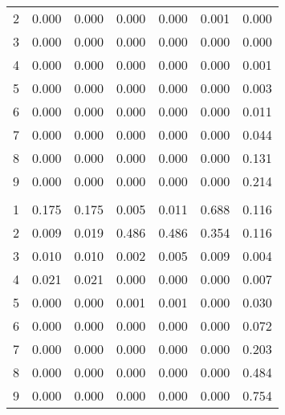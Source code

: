 \documentclass[12pt]{article}
\theoremstyle{plain}
\numberwithin{equation}{section}
\begin{document}
\begin{footnotesize}
\begin{longtable}[t]{ccccccc}
\hspace{1em}2 & 0.000 & 0.000 & 0.000 & 0.000 & 0.001 & 0.000\\
\hspace{1em}3 & 0.000 & 0.000 & 0.000 & 0.000 & 0.000 & 0.000\\
\hspace{1em}4 & 0.000 & 0.000 & 0.000 & 0.000 & 0.000 & 0.001\\
\hspace{1em}5 & 0.000 & 0.000 & 0.000 & 0.000 & 0.000 & 0.003\\
\hspace{1em}6 & 0.000 & 0.000 & 0.000 & 0.000 & 0.000 & 0.011\\
\hspace{1em}7 & 0.000 & 0.000 & 0.000 & 0.000 & 0.000 & 0.044\\
\hspace{1em}8 & 0.000 & 0.000 & 0.000 & 0.000 & 0.000 & 0.131\\
\hspace{1em}9 & 0.000 & 0.000 & 0.000 & 0.000 & 0.000 & 0.214\\
\addlinespace[0.3em]
\multicolumn{7}{l}{\textbf{Global Financial Crisis (2008 November) Sample}}\\
\hspace{1em}1 & 0.175 & 0.175 & 0.005 & 0.011 & 0.688 & 0.116\\
\hspace{1em}2 & 0.009 & 0.019 & 0.486 & 0.486 & 0.354 & 0.116\\
\hspace{1em}3 & 0.010 & 0.010 & 0.002 & 0.005 & 0.009 & 0.004\\
\hspace{1em}4 & 0.021 & 0.021 & 0.000 & 0.000 & 0.000 & 0.007\\
\hspace{1em}5 & 0.000 & 0.000 & 0.001 & 0.001 & 0.000 & 0.030\\
\hspace{1em}6 & 0.000 & 0.000 & 0.000 & 0.000 & 0.000 & 0.072\\
\hspace{1em}7 & 0.000 & 0.000 & 0.000 & 0.000 & 0.000 & 0.203\\
\hspace{1em}8 & 0.000 & 0.000 & 0.000 & 0.000 & 0.000 & 0.484\\
\hspace{1em}9 & 0.000 & 0.000 & 0.000 & 0.000 & 0.000 & 0.754\\
\bottomrule
\end{longtable}

\end{footnotesize}
\end{document}

